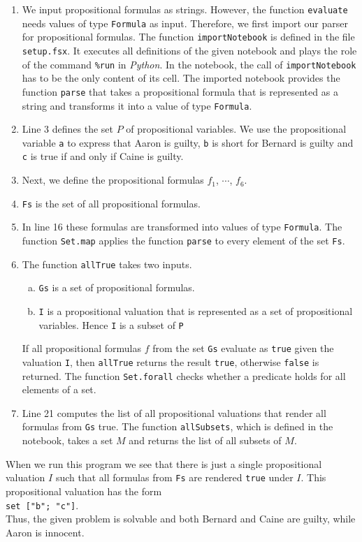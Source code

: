 \begin{enumerate}
\item We input propositional formulas as strings.  However, the function \texttt{evaluate} needs values of type
      \texttt{Formula} as input.  Therefore, we first import our parser for propositional formulas.  The function
      \texttt{importNotebook} is defined in the file \texttt{setup.fsx}.  It executes all definitions of the given
      notebook and plays the role of the command \texttt{\%run} in \textsl{Python}.  In the notebook, the call of
      \texttt{importNotebook} has to be the only content of its cell.  The imported notebook provides the function
      \texttt{parse} that takes a propositional formula that is represented as a string and transforms it into a
      value of type \texttt{Formula}.
\item Line 3 defines the set $P$ of propositional variables.  We use the propositional variable \texttt{a} to
      express that Aaron is guilty, \texttt{b} is short for Bernard is guilty and \texttt{c} is true if and
      only if Caine is guilty. 
\item Next, we define the propositional formulas $f_1$, $\cdots$, $f_6$.
\item \texttt{Fs} is the set of all propositional formulas.
\item In line 16 these formulas are transformed into values of type \texttt{Formula}.  The function \texttt{Set.map}
      applies the function \texttt{parse} to every element of the set \texttt{Fs}.
\item The function \texttt{allTrue} takes two inputs.
      \begin{enumerate}[(a)]
      \item \texttt{Gs} is a set of propositional formulas.
      \item \texttt{I} is a propositional valuation that is represented as a set of propositional variables.
            Hence \texttt{I} is a subset of \texttt{P}
      \end{enumerate}
      If all propositional formulas $f$ from the set \texttt{Gs} evaluate as \texttt{true} given the valuation
      \texttt{I}, then \texttt{allTrue} returns the result \texttt{true}, otherwise \texttt{false} is returned.
      The function \texttt{Set.forall} checks whether a predicate holds for all elements of a set.
\item Line 21 computes the list of all propositional valuations that render all formulas from \texttt{Gs} true.
      The function \texttt{allSubsets}, which is defined in the notebook, takes a set $M$ and returns the list of
      all subsets of $M$.
\end{enumerate}
When we run this program we see that there is just a single propositional valuation $I$ such that all formulas
from \texttt{Fs} are rendered \texttt{true} under $I$.  This propositional valuation has the form
\\[0.2cm]
\hspace*{1.3cm}
\texttt{set ["b"; "c"]}.
\\[0.2cm]
Thus, the given problem is solvable and both Bernard and Caine are guilty, while Aaron is innocent.
\pagebreak

